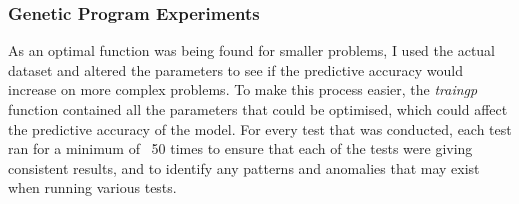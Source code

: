 \documentclass[11pt]{article}
\begin{document}
\subsubsection{Genetic Program Experiments}
As an optimal function was being found for smaller problems, I used the actual dataset and altered the parameters to see if the predictive accuracy would increase on more complex problems. To make this process easier, the \textit{train\textunderscore gp} function contained all the parameters that could be optimised, which could affect the predictive accuracy of the model. For every test that was conducted, each test ran for a minimum of \
50 times to ensure that each of the tests were giving consistent results, and to identify any patterns and anomalies that may exist when running various tests.   \\
\end{document}
